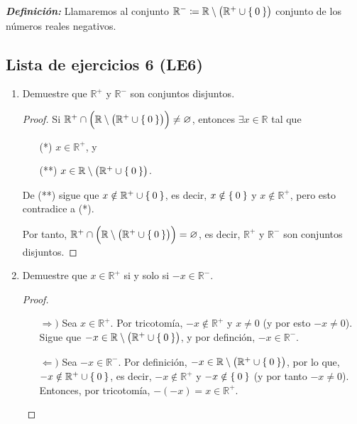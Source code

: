 \documentclass[11pt]{article}
\newcommand{\R}{\mathbb{R}}
\newcommand{\defined}{\coloneqq}
\newcommand{\bfit}[1]{\textbf{\textit{#1}}}
\let\emptyset\varnothing
\let\set\Set
\let\union\cup
\let\intersection\cap
\begin{document}
\bfit{Definición:} Llamaremos al conjunto $\R^-\defined \R\setminus\bigl(\R^+\union \set{0}\bigr)$ conjunto de los números reales negativos.

\subsection*{Lista de ejercicios 6 (LE6)}

\begin{enumerate}[label=\alph*)]
 \item Demuestre que $\R^+$ y $\R^-$ son conjuntos disjuntos.
 \begin{proof}%
 Si $\R^+ \intersection \Bigl(\R\setminus\bigl(\R^+\union \set{0}\bigr)\Bigr) \neq \emptyset$, entonces $\exists x\in \R$ tal que \begin{itemize}%
 \item[(*)] $x\in \R^+$, y 
 \item[(**)] $x\in \R\setminus\bigl(\R^+\union \set{0}\bigr)$.
 \end{itemize}  De (**) sigue que $x\notin \R^+\union \set{0}$, es decir, $x\notin \set{0}$ y $x\notin \R^+$, pero esto contradice a (*).

 Por tanto, $\R^+ \intersection \Bigl(\R\setminus\bigl(\R^+\union \set{0}\bigr)\Bigr) = \emptyset$, es decir, $\R^+$ y $\R^-$ son conjuntos disjuntos.
 \end{proof}

 \item Demuestre que $x\in \R^+$ si y solo si $-x\in \R^-$.
 \begin{proof}\leavevmode
 \begin{itemize}
 \item[$\Rightarrow)$] Sea $x\in \R^+$. Por tricotomía, $-x\notin \R^+$ y $x\neq 0$ (y por esto $-x\neq 0$). Sigue que $-x\in \R\setminus \bigl(\R^+\union \set{0}\bigr)$, y por definción, $-x\in \R^-$.
 \item[$\Leftarrow)$] Sea $-x\in \R^-$. Por definición, $-x\in \R\setminus\bigl(\R^+\union \set{0}\bigr)$, por lo que, $-x\notin \R^+\union \set{0}$, es decir, $-x\notin \R^+$ y $-x\notin \set{0}$ (y por tanto $-x\neq 0$). Entonces, por tricotomía, $-(-x)=x\in \R^+$. \qedhere
 \end{itemize}
 \end{proof}


\end{enumerate}
\end{document}
